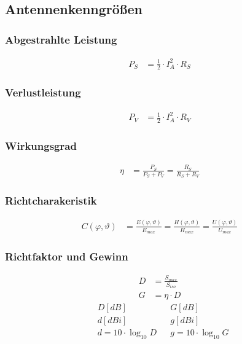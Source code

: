 \subsection{Antennenkenngrößen}



\subsubsection{Abgestrahlte Leistung}
\begin{align*}
    P_S & = \frac{1}{2}\cdot I_A^2 \cdot R_S
\end{align*}

\subsubsection{Verlustleistung}
\begin{align*}
    P_V & = \frac{1}{2}\cdot I_A^2\cdot R_V
\end{align*}

\subsubsection{Wirkungsgrad}
\begin{align*}
    \eta & = \frac{P_S}{P_S + P_V} = \frac{R_S}{R_S + R_V}
\end{align*}

\subsubsection{Richtcharakeristik}
\begin{align*}
    C(\varphi,\vartheta) & = \frac{E(\varphi,\vartheta)}{E_{max}} = \frac{H(\varphi,\vartheta)}{H_{max}} = \frac{U(\varphi,\vartheta)}{U_{max}}
\end{align*}

\subsubsection{Richtfaktor und Gewinn}
\begin{align*}
    D & =\frac{S_{max}}{S_{iso}} \\
    G & = \eta\cdot D
\end{align*}
\begin{align*}
     & D\left[\si{dB}\right]  &  & G\left[\si{dB}\right]  \\
     & d\left[\si{dBi}\right] &  & g\left[\si{dBi}\right] \\
     & d = 10\cdot\log_{10} D &  & g  = 10\cdot\log_{10}G
\end{align*}

